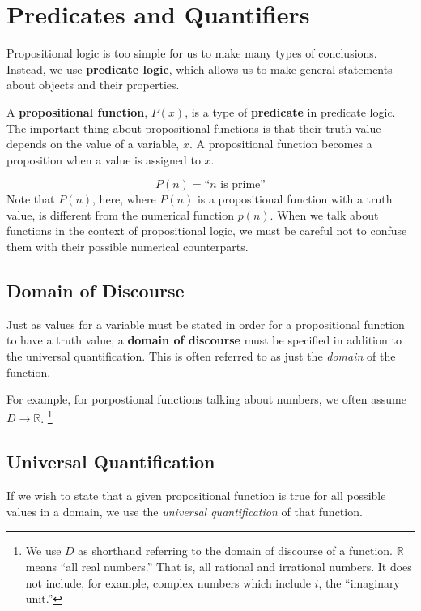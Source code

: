 \chapter{Predicates and Quantifiers}

Propositional logic is too simple for us to make many types of conclusions.
Instead, we use \textbf{predicate logic}, which allows us to make general
statements about objects and their properties.

A \textbf{propositional function}, $P(x)$, is a
type of \textbf{predicate} in
predicate logic. The important thing about propositional functions is that their
truth value depends on the value of a variable, $x$. A propositional function
becomes a proposition when a value is assigned to $x$.
\begin{ex}
  \[ P(n)=\text{``$n$ is prime''} \]
  Note that $P(n)$, here, where $P(n)$ is a propositional function with a truth value,
  is different from the numerical function $p(n)$. When we talk about functions in the
  context of propositional logic, we must be careful not to confuse them with their possible
  numerical counterparts.
\end{ex}


\section{Domain of Discourse}
Just as values for a variable must be stated in order for a propositional function to have a truth value, a \textbf{domain of discourse} must be specified in addition to the universal quantification.
This is often referred to as just the \emph{domain} of the function.


For example, for porpostional functions talking about numbers, we often assume $D \to\mathbb{R}$.
\footnote{We use $D$ as shorthand referring to the domain of discourse of a function.
$\mathbb{R}$ means ``all real numbers.'' That is, all rational and irrational numbers. It does not include, for example, complex numbers which include $i$, the ``imaginary unit.''}


\section{Universal Quantification}
If we wish to state that a given propositional function is true for all possible values in a domain, we use the \emph{universal quantification} of that function.


